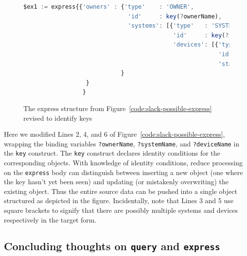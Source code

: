 \documentclass[10pt,letterpaper]{article} %
\newcommand{\stt}[1]{\texttt{#1}} %
\begin{document}
\begin{figure}[H]
  \caption{The express structure from Figure~\ref{code:slack-possible-express} revised to identify keys}
 \label{code:slack-express-with-keys}
\begin{lstlisting}[language=JavaScript,basicstyle=\ttfamily\scriptsize,numberstyle=\scriptsize]
$ex1 := express{{'owners' : {'type'    : 'OWNER',
                              'id'     : key(?ownerName),
                              'systems': [{'type'   : 'SYSTEM',
                                           'id'     : key(?systemName),
                                           'devices': [{'type'  : 'DEVICE',
                                                        'id'    : key(?deviceName),
                                                        'status': ?status}]}]
                            }
                  }
                 }
\end{lstlisting}
\end{figure}  \vspace{-2em}

Here we modified Lines 2, 4, and 6 of Figure~\ref{code:slack-possible-express}, wrapping the binding variables
\stt{?ownerName}, \stt{?systemName}, and \stt{?deviceName} in the \stt{key} construct.
The \stt{key} construct declares identity conditions for the corresponding objects.
With knowledge of identity conditions, reduce processing on the \stt{express} body can distinguish between inserting a new object (one where the key hasn't yet been seen) and updating (or mistakenly overwriting) the existing object.
Thus the entire source data can be pushed into a single object structured as depicted in the figure.
Incidentally, note that Lines 3 and 5 use square brackets to signify that there are possibly multiple systems and devices respectively
in the target form.


\subsection{Concluding thoughts on \stt{query} and \stt{express}}
\end{document}
